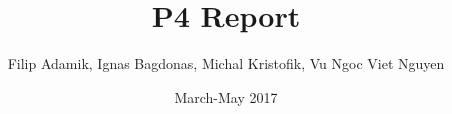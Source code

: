 \documentclass[12pt]{article}
\title{P4 Report}
\author{Filip Adamik, Ignas Bagdonas, Michal Kristofik, Vu Ngoc Viet Nguyen}
\date{March-May 2017}
\begin{document}
% 
% 
% 
\tableofcontents


\pagebreak


\pagebreak


\pagebreak
%

\pagebreak


\pagebreak


\pagebreak


\pagebreak


\pagebreak


\pagebreak


\pagebreak


\pagebreak

\printbibliography
\end{document}
